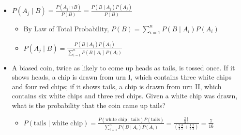 \documentclass{article}
\begin{document}
\begin{itemize}
    $P(A_j \mid B) = \frac{P(B \mid A_j) P(A_j)}{\sum_{i=1}^n P(B \mid A_i) P(A_i)} = \frac{P(A_j \cap B)}{P(B)}$
    \item $P(A_j \mid B) = \frac{P(A_j \cap B)}{P(B)} = \frac{P(B \mid A_j)P(A_j)}{P(B)}$
    \begin{itemize}
        \item By Law of Total Probability, $P(B) = \sum_{i=1}^n P(B \mid A_i)P(A_i)$
        \item $P(A_j \mid B) = \frac{P(B \mid A_j)P(A_j)}{\sum_{i=1}^n P(B \mid A_i)P(A_i)}$
    \end{itemize}
    \item A biased coin, twice as likely to come up heads as tails, is tossed once. If it shows heads, a chip is drawn from urn I, which contains three white chips and four red chips; if it shows tails, a chip is drawn from urn II, which contains six white chips and three red chips. Given a white chip was drawn, what is the probability that the coin came up tails?
    \begin{itemize}
        \item $P(\text{tails} \mid \text{white chip}) = \frac{P(\text{white chip} \mid \text{tails}) P(\text{tails})}{\sum_{i=1}^n P(B \mid A_i) P(A_i)}= \frac{\frac{2}{3} \frac{1}{3}}{(\frac{2}{3} \frac{3}{7} + \frac{1}{3} \frac{2}{3})} = \frac{7}{16}$
    \end{itemize}
\end{itemize}
\end{document}
